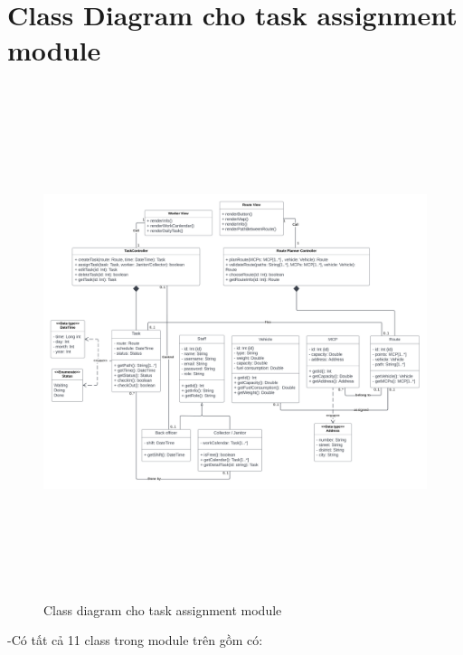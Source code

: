 \section{Class Diagram cho task assignment module}
    \begin{figure}[h]
        \centering
        \includegraphics[width=18.0cm,height=15cm]{imgs/class diagram/UWC class diagram.png}
        \caption{Class diagram cho task assignment module}
    \end{figure}
    \newpage
    -Có tất cả 11 class trong module trên gồm có:
